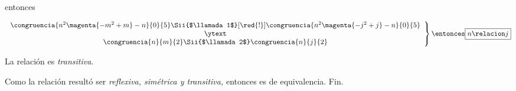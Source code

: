 \begin{enumerate}[label=\alph*)]
        entonces

        $$
          \left.
          \begin{array}{c}
            \congruencia{n^2 \magenta{- m^2 + m} - n}{0}{5}
            \Sii{$\llamada1$}[\red{!}]
            \congruencia{n^2 \magenta{- j^2 + j} - n}{0}{5}
            \\
            \ytext \\
            \congruencia{n}{m}{2}
            \Sii{$\llamada2$}
            \congruencia{n}{j}{2}
          \end{array}
          \right\}
          \entonces
          \boxed{
            n \relacion j}
        $$\par
        La relación es \textit{transitiva}.\par
        Como la relación resultó ser \textit{reflexiva, simétrica y transitiva,} entonces es de equivalencia. Fin.
\end{enumerate}

